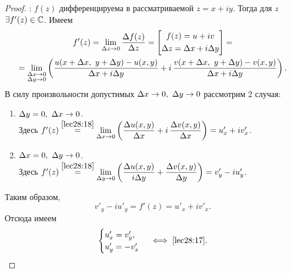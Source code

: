 \documentclass[../../main.tex]{subfiles}
\begin{document}
\begin{proof}
	\;

	\nec: $f(z)$ дифференцируема в рассматриваемой $z = x + i y$.
	Тогда для $z$ $\exists f'(z) \in \mathbb{C}$. Имеем
	\begin{equation}
	\label{lec28:18}
	\begin{gathered}
	f'(z) = \lim\limits_{\Delta z \to 0} \frac{\Delta f(z)}{\Delta z} = 
	\left[\begin{gathered}
	f(z) = u + i v \\
	\Delta z = \Delta x + i \Delta y
	\end{gathered}\right] = \\ =
	\lim\limits_{\substack{\Delta x \to 0\\\Delta y \to 0}} \left(
	\frac{u(x + \Delta x,\ y + \Delta y) - u(x, y)}{\Delta x + i \Delta y} +
	i\, \frac{v(x + \Delta x,\ y + \Delta y) - v(x, y)}{\Delta x + i \Delta y}\right).
	\end{gathered}
	\end{equation}
	В силу произвольности допустимых $\Delta x \to 0,\ \Delta y \to 0$
	рассмотрим 2 случая:
	\begin{enumerate}
	\item $\Delta y = 0,\ \Delta x \to 0$. \\
	Здесь $f'(z) \stk{lec28:18}{=} \lim\limits_{\D x \to 0}
	\left(\dfrac{\D u(x, y)}{\D x} + i\, \dfrac{\D v(x, y)}{\D x}\right) =
	u'_x + i v'_x$.
	\item $\Delta x = 0,\ \Delta y \to 0$. \\
	Здесь $f'(z) \stk{lec28:18}{=} \lim\limits_{\D y \to 0}
	\left(\dfrac{\D u(x, y)}{i \D y} + \dfrac{\D v(x, y)}{\D y}\right) =
	v'_y - i u'_y$.
	\end{enumerate}
	Таким образом,
	\[
	v'_y - i u'_y = f'(z) = u'_x + i v'_x.
	\]
	Отсюда имеем
	\[
	\begin{cases}
		u'_x = v'_y, \\
		u'_y = -v'_x
	\end{cases}
	\iff \eqref{lec28:17}.
	\]
	

\end{proof}
\end{document}
